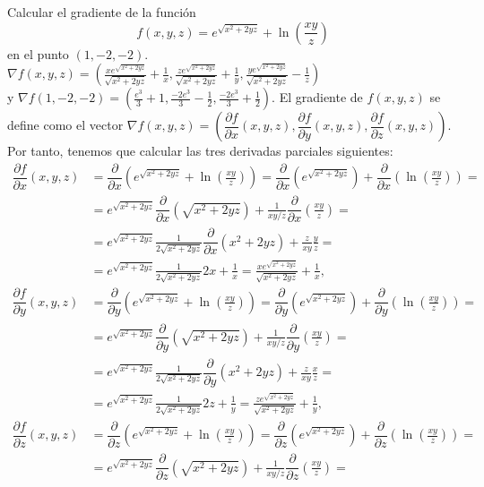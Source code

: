 {Calcular el gradiente de la función
\[
f(x,y,z)=e^{\sqrt{x^2+2yz}}+\ln (\frac{xy}z)
\]
en el punto $(1,-2,-2)$.
}
{$\nabla f(x,y,z)=\left(\frac{xe^{\sqrt{x^2+2yz}}}{\sqrt{x^2+2yz}}+\frac{1}{x}, \frac{ze^{\sqrt{x^2+2yz}}}{\sqrt{x^2+2yz}}+\frac{1}{y}, \frac{ye^{\sqrt{x^2+2yz}}}{\sqrt{x^2+2yz}}-\frac{1}{z}\right)$\\ y $\nabla f(1,-2,-2)=\left(\frac{e^3}{3}+1,\frac{-2e^3}{3}-\frac{1}{2},\frac{-2e^3}{3}+\frac{1}{2}\right)$.}
{El gradiente de $f(x,y,z)$ se define como el vector $\nabla f(x,y,z)=\left(\dfrac{\partial f}{\partial x}(x,y,z),\dfrac{\partial f}{\partial y}(x,y,z),\dfrac{\partial f}{\partial z}(x,y,z)\right).$ Por tanto, tenemos que calcular las tres derivadas parciales siguientes:
\begin{align*}
\dfrac{\partial f}{\partial x}(x,y,z) &= \dfrac{\partial}{\partial x}(e^{\sqrt{x^2+2yz}}+\ln (\frac{xy}z)) = \dfrac{\partial}{\partial x}(e^{\sqrt{x^2+2yz}})+\dfrac{\partial}{\partial x}(\ln (\frac{xy}z))= \\
&= e^{\sqrt{x^2+2yz}}\dfrac \partial {\partial x}(\sqrt{x^2+2yz})+\frac{1}{xy/z}\dfrac{\partial}{\partial x}(\frac{xy}z)= \\
&= e^{\sqrt{x^2+2yz}}\frac{1}{2\sqrt{x^2+2yz}}\dfrac{\partial}{\partial x}(x^2+2yz)+\frac{z}{xy}\frac{y}{z}= \\
&= e^{\sqrt{x^2+2yz}}\frac{1}{2\sqrt{x^2+2yz}}2x+\frac{1}{x} = \frac{xe^{\sqrt{x^2+2yz}}}{\sqrt{x^2+2yz}}+\frac{1}{x}, \\
\dfrac{\partial f}{\partial y}(x,y,z) &= \dfrac{\partial}{\partial y}(e^{\sqrt{x^2+2yz}}+\ln (\frac{xy}z)) = \dfrac{\partial}{\partial y}(e^{\sqrt{x^2+2yz}})+\dfrac{\partial}{\partial y}(\ln (\frac{xy}z))= \\
&= e^{\sqrt{x^2+2yz}}\dfrac{\partial}{\partial y}(\sqrt{x^2+2yz})+\frac{1}{xy/z}\dfrac{\partial}{\partial y}(\frac{xy}z)= \\
&= e^{\sqrt{x^2+2yz}}\frac{1}{2\sqrt{x^2+2yz}}\dfrac{\partial}{\partial y}(x^2+2yz)+\frac{z}{xy}\frac{x}{z}= \\
&= e^{\sqrt{x^2+2yz}}\frac{1}{2\sqrt{x^2+2yz}}2z+\frac{1}{y}=\frac{ze^{\sqrt{x^2+2yz}}}{\sqrt{x^2+2yz}}+\frac{1}{y}, \\
\dfrac{\partial f}{\partial z}(x,y,z) &= \dfrac{\partial}{\partial z}(e^{\sqrt{x^2+2yz}}+\ln (\frac{xy}z)) = \dfrac{\partial}{\partial z}(e^{\sqrt{x^2+2yz}})+\dfrac{\partial}{\partial z}(\ln (\frac{xy}{z}))= \\
&= e^{\sqrt{x^2+2yz}}\dfrac{\partial}{\partial z}(\sqrt{x^2+2yz})+\frac{1}{xy/z}\dfrac{\partial}{\partial z}(\frac{xy}{z})= \\

\end{align*}}
